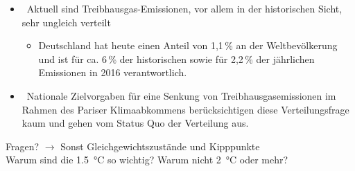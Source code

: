 \begin{frame}
{\begin{itemize}
\begin{itemize}
          \item[\rightarrow] Werden historische Emissionen der Länder berücksichtigt?
        \end{itemize}
        \item[] Aktuell sind Treibhausgas-Emissionen, vor allem in der historischen Sicht, sehr ungleich verteilt
        \begin{itemize}
          \item[\rightarrow] Deutschland hat heute einen Anteil von 1,1\,\% an der Weltbevölkerung und ist für ca. 6\,\% der historischen sowie für 2,2\,\% der jährlichen Emissionen in 2016 verantwortlich.
        \end{itemize}
        \item[] Nationale Zielvorgaben für eine Senkung von Treibhausgasemissionen im Rahmen des Pariser Klimaabkommens berücksichtigen diese Verteilungsfrage kaum und gehen vom Status Quo der Verteilung aus.
      \end{itemize}
      Fragen? $\rightarrow$ Sonst Gleichgewichtszustände und Kipppunkte\\
      Warum sind die \SI{1.5}{\degreeCelsius} so wichtig? Warum nicht \SI{2}{\degreeCelsius} oder mehr?
    }
\end{frame}
